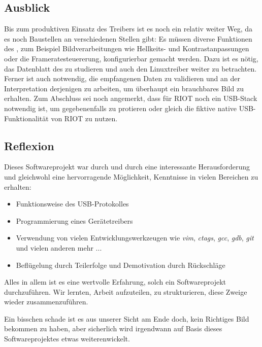 \subsection{Ausblick}
Bis zum produktiven Einsatz des Treibers ist es noch ein relativ weiter Weg, da es noch Baustellen an verschiedenen Stellen gibt:
Es müssen diverse Funktionen des \saa, zum Beispiel Bildverarbeitungen wie Hellkeits- und Kontrastanpassungen oder die Frameratesteuererung, konfigurierbar gemacht werden.
Dazu ist es nötig, das Datenblatt des \saa{} zu studieren und auch den Linuxtreiber weiter zu betrachten.
Ferner ist auch notwendig, die empfangenen Daten zu validieren und an der Interpretation derjenigen zu arbeiten, um überhaupt ein brauchbares Bild zu erhalten.
Zum Abschluss sei noch angemerkt, dass für RIOT noch ein USB-Stack notwendig ist, um gegebenenfalls \libusb{} zu protieren oder gleich die fiktive native USB-Funktionalität von RIOT zu nutzen.

\subsection{Reflexion}
Dieses Softwareprojekt war durch und durch eine interessante Herausforderung und gleichwohl eine hervorragende Möglichkeit, Kenntnisse in vielen Bereichen zu erhalten:
\begin{itemize}
 \item Funktionsweise des USB-Protokolles
 \item Programmierung eines Gerätetreibers
 \item Verwendung von vielen Entwicklungswerkzeugen wie \emph{vim}, \emph{ctags}, \emph{gcc}, \emph{gdb}, \emph{git} und vielen anderen mehr ...
 \item Beflügelung durch Teilerfolge und Demotivation durch Rückschläge
\end{itemize}
Alles in allem ist es eine wertvolle Erfahrung, solch ein Softwareprojekt durchzuführen.
Wir lernten, Arbeit aufzuteilen, zu strukturieren, diese Zweige wieder zusammenzuführen.

Ein bisschen schade ist es aus unserer Sicht am Ende doch, kein Richtiges Bild bekommen zu haben, aber sicherlich wird irgendwann auf Basis dieses Softwareprojektes etwas weiterenwickelt.
